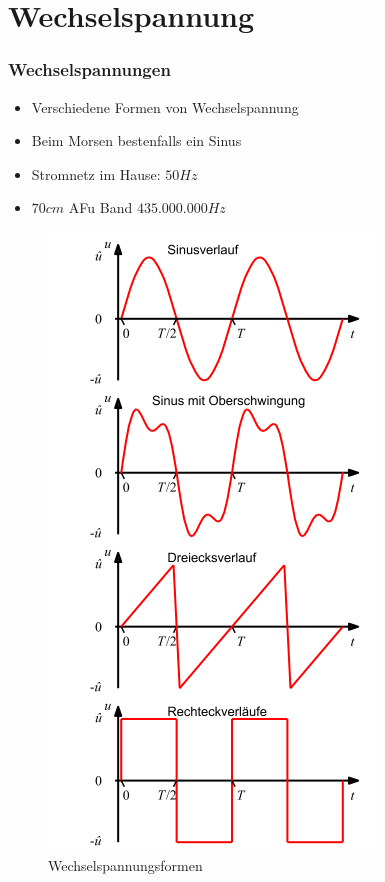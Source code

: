 \section*{Wechsel\-spannung}

\begin{frame}
  \frametitle{Wechselspannungen}
  \begin{minipage}{0.4\textwidth}
  	\begin{itemize}
  		\item Verschiedene Formen von Wechselspannung
  		\item Beim Morsen bestenfalls ein Sinus
  		\item Stromnetz im Hause: $50Hz$
  		\item $70cm$ AFu Band $435.000.000Hz$
  	\end{itemize}
  \end{minipage}
  \begin{minipage}{0.4\textwidth}
    \begin{figure}
      \includegraphics[height=0.85\textheight,keepaspectratio]{e02/Wechselspannungsformen_trunc.png}
      \caption{Wechselspannungsformen \cite{ac}}
      \label{fig_ac}
    \end{figure}
  \end{minipage}
  
\end{frame}


